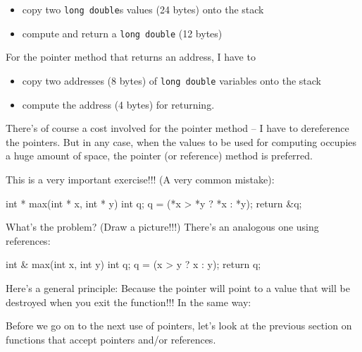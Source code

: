 \begin{itemize}

\item
  copy two \texttt{long double}s values (24 bytes) onto the stack
\item
  compute and return a \texttt{long double} (12 bytes)
\end{itemize}

For the pointer method that returns an address, I have to

\begin{itemize}

\item
  copy two addresses (8 bytes) of \texttt{long double} variables onto the stack
\item
  compute the address (4 bytes) for returning.
\end{itemize}

There's of course a cost involved for the pointer method -- I have to dereference the pointers. But in any case, when the values to be used for computing occupies a huge amount of space, the pointer (or reference) method is preferred.

\begin{ex}
This is a very important exercise!!! (A very common mistake):

\begin{consolethree}[escapeinside=||]
int * max(int * x, int * y)
{
    int q;
    q = (*x > *y ? *x : *y);
    return &q;
}
\end{consolethree}
What's the problem? (Draw a picture!!!) There's an analogous one using references:
\end{ex}

\begin{consolethree}[escapeinside=||]
int & max(int x, int y)
{
    int q;
    q = (x > y ? x : y);
    return q;
}
\end{consolethree}

Here's a general principle:  Because the pointer will point to a value that will be destroyed when you exit the function!!! In the same way: 

\newpage{}

Before we go on to the next use of pointers, let's look at the previous section on functions that accept pointers and/or references.

